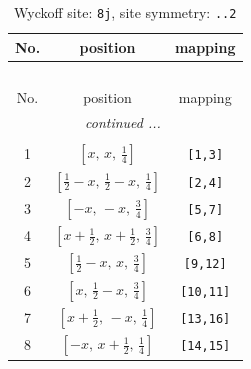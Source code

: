\documentclass[fleqn,8pt]{jsarticle}
\begin{document}
\begin{longtable}{ccc}
\caption{Wyckoff site: {\tt 8j}, site symmetry: {\tt ..2}}
 \\
 \hline \hline
No. & position & mapping \\ \hline \endfirsthead

\multicolumn{2}{l}{\tablename\ \thetable{}} \\
 \hline \hline
No. & position & mapping \\ \hline \endhead

 \hline \hline
\multicolumn{2}{r}{\footnotesize\it continued ...} \\ \endfoot

 \hline \hline
\multicolumn{2}{r}{} \\ \endlastfoot

1 & $\left[ x,\, x,\, \frac{1}{4} \right]$ & {\tt [1,3]} \\ \hline
2 & $\left[ \frac{1}{2} - x,\, \frac{1}{2} - x,\, \frac{1}{4} \right]$ & {\tt [2,4]} \\ \hline
3 & $\left[ - x,\, - x,\, \frac{3}{4} \right]$ & {\tt [5,7]} \\ \hline
4 & $\left[ x + \frac{1}{2},\, x + \frac{1}{2},\, \frac{3}{4} \right]$ & {\tt [6,8]} \\ \hline
5 & $\left[ \frac{1}{2} - x,\, x,\, \frac{3}{4} \right]$ & {\tt [9,12]} \\ \hline
6 & $\left[ x,\, \frac{1}{2} - x,\, \frac{3}{4} \right]$ & {\tt [10,11]} \\ \hline
7 & $\left[ x + \frac{1}{2},\, - x,\, \frac{1}{4} \right]$ & {\tt [13,16]} \\ \hline
8 & $\left[ - x,\, x + \frac{1}{2},\, \frac{1}{4} \right]$ & {\tt [14,15]} \\
\end{longtable}
\renewcommand{\arraystretch}{1.2}
\end{document}

